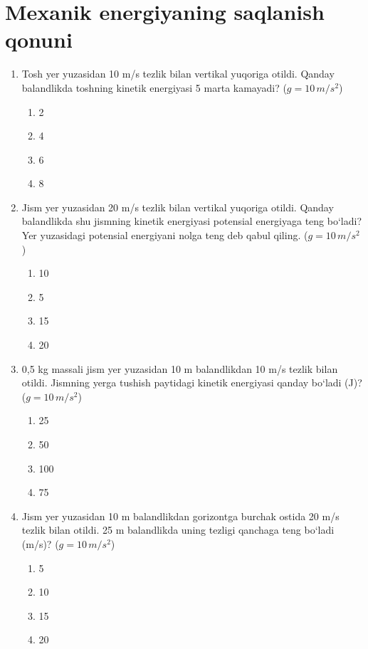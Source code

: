 
\section{Mexanik energiyaning saqlanish qonuni}

\begin{enumerate}

\item Tosh yer yuzasidan 10 m/s tezlik bilan vertikal yuqoriga otildi. Qanday balandlikda toshning kinetik energiyasi 5 marta kamayadi? ($g = 10 \, m/s^2$)
\begin{enumerate}[label=\Alph*)]
\item 2
\item 4
\item 6
\item 8
\end{enumerate}

\item Jism yer yuzasidan 20 m/s tezlik bilan vertikal yuqoriga otildi. Qanday balandlikda shu jismning kinetik energiyasi potensial energiyaga teng bo‘ladi? Yer yuzasidagi potensial energiyani nolga teng deb qabul qiling. ($g = 10 \, m/s^2$)
\begin{enumerate}[label=\Alph*)]
\item 10
\item 5
\item 15
\item 20
\end{enumerate}

\item 0,5 kg massali jism yer yuzasidan 10 m balandlikdan 10 m/s tezlik bilan otildi. Jismning yerga tushish paytidagi kinetik energiyasi qanday bo‘ladi (J)? ($g = 10 \, m/s^2$)
\begin{enumerate}[label=\Alph*)]
\item 25
\item 50
\item 100
\item 75
\end{enumerate}

\item Jism yer yuzasidan 10 m balandlikdan gorizontga burchak ostida 20 m/s tezlik bilan otildi. 25 m balandlikda uning tezligi qanchaga teng bo‘ladi (m/s)? ($g = 10 \, m/s^2$)
\begin{enumerate}[label=\Alph*)]
\item 5
\item 10
\item 15
\item 20
\end{enumerate}


\end{enumerate}
